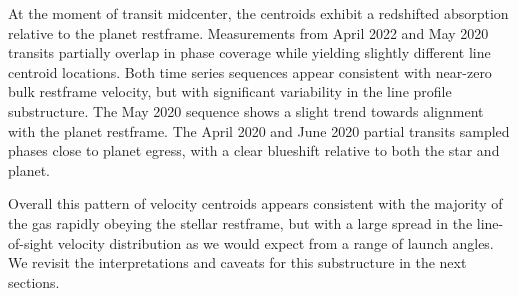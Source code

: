 \documentclass[twocolumn]{aastex631}
\begin{document}
At the moment of transit midcenter, the centroids exhibit a redshifted absorption relative to the planet restframe. Measurements from April 2022 and May 2020 transits partially overlap in phase coverage while yielding slightly different line centroid locations.  Both time series sequences appear consistent with near-zero bulk restframe velocity, but with significant variability in the line profile substructure.  The May 2020 sequence shows a slight trend towards alignment with the planet restframe.  The April 2020 and June 2020 partial transits sampled phases close to planet egress, with a clear blueshift relative to both the star and planet.

Overall this pattern of velocity centroids appears consistent with the majority of the gas rapidly obeying the stellar restframe, but with a large spread in the line-of-sight velocity distribution as we would expect from a range of launch angles.  We revisit the interpretations and caveats for this substructure in the next sections.
\end{document}
